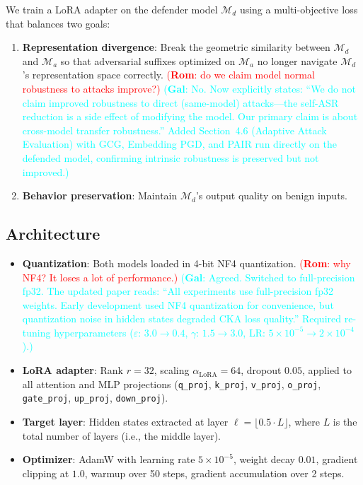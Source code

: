 \documentclass[11pt]{article}
\newcommand\rom[1]{\textcolor{red}{(\textbf{Rom}: #1)}} %
\newcommand\gal[1]{\textcolor{cyan}{(\textbf{Gal}: #1)}} %
\begin{document}
We train a LoRA adapter on the defender model $\mathcal{M}_d$ using a multi-objective loss that balances two goals:
\begin{enumerate}[noitemsep]
    \item \textbf{Representation divergence}: Break the geometric similarity between $\mathcal{M}_d$ and $\mathcal{M}_a$ so that adversarial suffixes optimized on $\mathcal{M}_a$ no longer navigate $\mathcal{M}_d$'s representation space correctly. \rom{do we claim model normal robustness to attacks improve?} \gal{No. Now explicitly states: ``We do not claim improved robustness to direct (same-model) attacks---the self-ASR reduction is a side effect of modifying the model. Our primary claim is about cross-model transfer robustness.'' Added Section~4.6 (Adaptive Attack Evaluation) with GCG, Embedding PGD, and PAIR run directly on the defended model, confirming intrinsic robustness is preserved but not improved.}
    \item \textbf{Behavior preservation}: Maintain $\mathcal{M}_d$'s output quality on benign inputs.
\end{enumerate}

\subsection{Architecture}

\begin{itemize}[noitemsep]
    \item \textbf{Quantization}: Both models loaded in 4-bit NF4 quantization. \rom{why NF4? It loses a lot of performance.} \gal{Agreed. Switched to full-precision fp32. The updated paper reads: ``All experiments use full-precision fp32 weights. Early development used NF4 quantization for convenience, but quantization noise in hidden states degraded CKA loss quality.'' Required re-tuning hyperparameters ($\varepsilon$: $3.0 \to 0.4$, $\gamma$: $1.5 \to 3.0$, LR: $5 \times 10^{-5} \to 2 \times 10^{-4}$).}
    \item \textbf{LoRA adapter}: Rank $r=32$, scaling $\alpha_{\text{LoRA}}=64$, dropout $0.05$, applied to all attention and MLP projections (\texttt{q\_proj}, \texttt{k\_proj}, \texttt{v\_proj}, \texttt{o\_proj}, \texttt{gate\_proj}, \texttt{up\_proj}, \texttt{down\_proj}).
    \item \textbf{Target layer}: Hidden states extracted at layer $\ell = \lfloor 0.5 \cdot L \rfloor$, where $L$ is the total number of layers (i.e., the middle layer).
    \item \textbf{Optimizer}: AdamW with learning rate $5 \times 10^{-5}$, weight decay $0.01$, gradient clipping at $1.0$, warmup over 50 steps, gradient accumulation over 2 steps.
\end{itemize}
\end{document}
